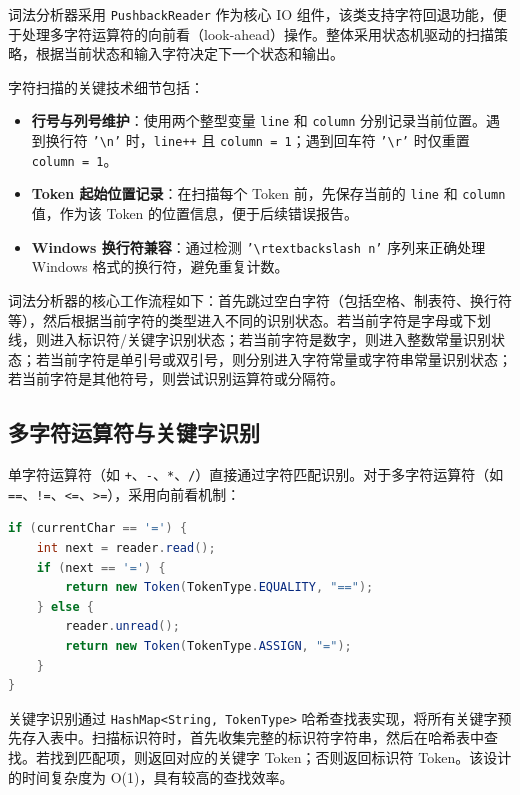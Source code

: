 \documentclass[12pt,hyperref,a4paper,UTF8]{ctexart}
\begin{document}
词法分析器采用 \texttt{PushbackReader} 作为核心 IO 组件，该类支持字符回退功能，便于处理多字符运算符的向前看（look-ahead）操作。整体采用状态机驱动的扫描策略，根据当前状态和输入字符决定下一个状态和输出。

字符扫描的关键技术细节包括：

\begin{itemize}
    \item \textbf{行号与列号维护}：使用两个整型变量 \texttt{line} 和 \texttt{column} 分别记录当前位置。遇到换行符 \texttt{'\textbackslash n'} 时，\texttt{line++} 且 \texttt{column = 1}；遇到回车符 \texttt{'\textbackslash r'} 时仅重置 \texttt{column = 1}。
    \item \textbf{Token 起始位置记录}：在扫描每个 Token 前，先保存当前的 \texttt{line} 和 \texttt{column} 值，作为该 Token 的位置信息，便于后续错误报告。
    \item \textbf{Windows 换行符兼容}：通过检测 \texttt{'\textbackslash rtextbackslash n'} 序列来正确处理 Windows 格式的换行符，避免重复计数。
\end{itemize}

词法分析器的核心工作流程如下：首先跳过空白字符（包括空格、制表符、换行符等），然后根据当前字符的类型进入不同的识别状态。若当前字符是字母或下划线，则进入标识符/关键字识别状态；若当前字符是数字，则进入整数常量识别状态；若当前字符是单引号或双引号，则分别进入字符常量或字符串常量识别状态；若当前字符是其他符号，则尝试识别运算符或分隔符。

\subsection{多字符运算符与关键字识别}

单字符运算符（如 \texttt{+}、\texttt{-}、\texttt{*}、\texttt{/}）直接通过字符匹配识别。对于多字符运算符（如 \texttt{==}、\texttt{!=}、\texttt{<=}、\texttt{>=}），采用向前看机制：

\begin{lstlisting}[language=Java]
if (currentChar == '=') {
    int next = reader.read();
    if (next == '=') {
        return new Token(TokenType.EQUALITY, "==");
    } else {
        reader.unread();
        return new Token(TokenType.ASSIGN, "=");
    }
}
\end{lstlisting}

关键字识别通过 \texttt{HashMap<String, TokenType>} 哈希查找表实现，将所有关键字预先存入表中。扫描标识符时，首先收集完整的标识符字符串，然后在哈希表中查找。若找到匹配项，则返回对应的关键字 Token；否则返回标识符 Token。该设计的时间复杂度为 O(1)，具有较高的查找效率。
\end{document}
